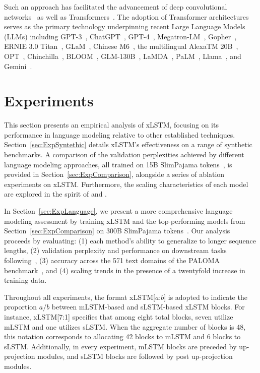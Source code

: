 Such an approach has facilitated the advancement of deep convolutional networks~\citep{He:16} as well as Transformers~\citep{Vaswani:17}. The adoption of Transformer architectures serves as the primary technology underpinning recent Large Language Models (LLMs) including GPT-3~\citep{Brown:20short}, ChatGPT~\citep{Schulman:22short}, GPT-4~\citep{Achiam:23gpt4short}, Megatron-LM~\citep{Shoeybi:19}, Gopher~\citep{Rae:21short}, ERNIE 3.0 Titan~\citep{Wang:21arxivshort}, GLaM~\citep{Du:21glamshort}, Chinese M6~\citep{Lin:21}, the multilingual AlexaTM 20B~\citep{Soltan:22}, OPT~\citep{Zhang:22opt}, Chinchilla~\citep{Hoffmann:22short}, BLOOM~\citep{Scao:22arxivshort}, GLM-130B~\citep{Zeng:22arxivshort}, LaMDA~\citep{Thoppilan:22short}, PaLM~\citep{Chowdhery:22short}, Llama~\citep{Touvron:23arxiv}, and Gemini~\citep{GeminiTeam:23arxiv,Reid:24arxiv}.

\section{Experiments}
\label{sec:Exp}

This section presents an empirical analysis of xLSTM, focusing on its performance in language modeling relative to other established techniques. Section~\ref{sec:ExpSyntethic} details xLSTM's effectiveness on a range of synthetic benchmarks. A comparison of the validation perplexities achieved by different language modeling approaches, all trained on 15B SlimPajama tokens~\citep{Soboleva:23}, is provided in Section~\ref{sec:ExpComparison}, alongside a series of ablation experiments on xLSTM. Furthermore, the scaling characteristics of each model are explored in the spirit of \citet{Kaplan:20} and \citet{Brown:20short}.

In Section~\ref{sec:ExpLanguage}, we present a more comprehensive language modeling assessment by training xLSTM and the top-performing models from Section~\ref{sec:ExpComparison} on 300B SlimPajama tokens~\citep{Soboleva:23}. Our analysis proceeds by evaluating: (1) each method’s ability to generalize to longer sequence lengths, (2) validation perplexity and performance on downstream tasks following~\citep{Sutawika:24}, (3) accuracy across the 571 text domains of the PALOMA benchmark~\citep{Magnusson:23arxivshort}, and (4) scaling trends in the presence of a twentyfold increase in training data.

Throughout all experiments, the format xLSTM[$a$:$b$] is adopted to indicate the proportion $a/b$ between mLSTM-based and sLSTM-based xLSTM blocks. For instance, xLSTM[7:1] specifies that among eight total blocks, seven utilize mLSTM and one utilizes sLSTM. When the aggregate number of blocks is 48, this notation corresponds to allocating 42 blocks to mLSTM and 6 blocks to sLSTM. Additionally, in every experiment, mLSTM blocks are preceded by up-projection modules, and sLSTM blocks are followed by post up-projection modules.

